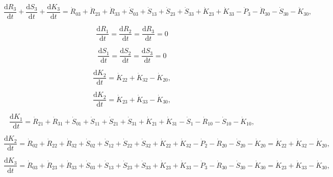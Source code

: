  \begin{equation} \label{eq:C-CV_R_dot_3}
 	\frac{\mathrm{d}R_{3}}{\mathrm{d}t} 
	+ \frac{\mathrm{d}S_{3}}{\mathrm{d}t}
 	+ \frac{\mathrm{d}K_{3}}{\mathrm{d}t}
 	=  \dot{R}_{03} + \dot{R}_{23} + \dot{R}_{33}
 	+ \dot{S}_{03} + \dot{S}_{13} 
	+ \dot{S}_{23} + \dot{S}_{33} 
 	+ \dot{K}_{23} + \dot{K}_{33}
 	- \dot{P}_{3}
 	- \dot{R}_{30} 
 	- \dot{S}_{30} 
 	- \dot{K}_{30},
 \end{equation}

\begin{equation}\label{eq:C-dR_dt_zero}
	\frac{\mathrm{d}R_{1}}{\mathrm{d}t} = \frac{\mathrm{d}R_{2}}{\mathrm{d}t} = \frac{\mathrm{d}R_{3}}{\mathrm{d}t} = 0
\end{equation}

\begin{equation}\label{eq:C-dS_dt_zero}
	\frac{\mathrm{d}S_{1}}{\mathrm{d}t} = \frac{\mathrm{d}S_{2}}{\mathrm{d}t} = \frac{\mathrm{d}S_{3}}{\mathrm{d}t} = 0
\end{equation}

\begin{equation} \label{eq:C-CV_K_dot_2}
	\frac{\mathrm{d}K_{2}}{\mathrm{d}t}
	=  \dot{K}_{22} + \dot{K}_{32} 
	- \dot{K}_{20},
\end{equation}

\begin{equation} \label{eq:C-CV_K_dot_3}
	\frac{\mathrm{d}K_{2}}{\mathrm{d}t}
	=  \dot{K}_{23} + \dot{K}_{33} 
	- \dot{K}_{30},
\end{equation}

 \begin{equation} \label{eq:C-CV_R_dot_1b}
 	\frac{\mathrm{d}K_{1}}{\mathrm{d}t}
 	=  \dot{R}_{21} + \dot{R}_{31}
 	+ \dot{S}_{01} + \dot{S}_{11} 
	+ \dot{S}_{21} + \dot{S}_{31}
 	+ \dot{K}_{21} + \dot{K}_{31}
 	- \dot{S}_{1} 
	- \dot{R}_{10} 
 	- \dot{S}_{10} 
 	- \dot{K}_{10},
 \end{equation}
 
 \begin{equation} \label{eq:C-CV_R_dot_2b}
 	\frac{\mathrm{d}K_{2}}{\mathrm{d}t}
 	=  \dot{R}_{02} + \dot{R}_{22} + \dot{R}_{32}
 	+ \dot{S}_{02} + \dot{S}_{12} 
	+ \dot{S}_{22} + \dot{S}_{32} 
 	+ \dot{K}_{22} + \dot{K}_{32}
 	- \dot{P}_{2}
 	- \dot{R}_{20} 
 	- \dot{S}_{20} 
 	- \dot{K}_{20}
	=  \dot{K}_{22} + \dot{K}_{32} 
	- \dot{K}_{20},
 \end{equation}
 
 \begin{equation} \label{eq:C-CV_R_dot_3}
 	\frac{\mathrm{d}K_{3}}{\mathrm{d}t}
 	=  \dot{R}_{03} + \dot{R}_{23} + \dot{R}_{33}
 	+ \dot{S}_{03} + \dot{S}_{13} 
	+ \dot{S}_{23} + \dot{S}_{33} 
 	+ \dot{K}_{23} + \dot{K}_{33}
 	- \dot{P}_{3}
 	- \dot{R}_{30} 
 	- \dot{S}_{30} 
 	- \dot{K}_{30}
	=  \dot{K}_{23} + \dot{K}_{33} 
	- \dot{K}_{30},
 \end{equation}


